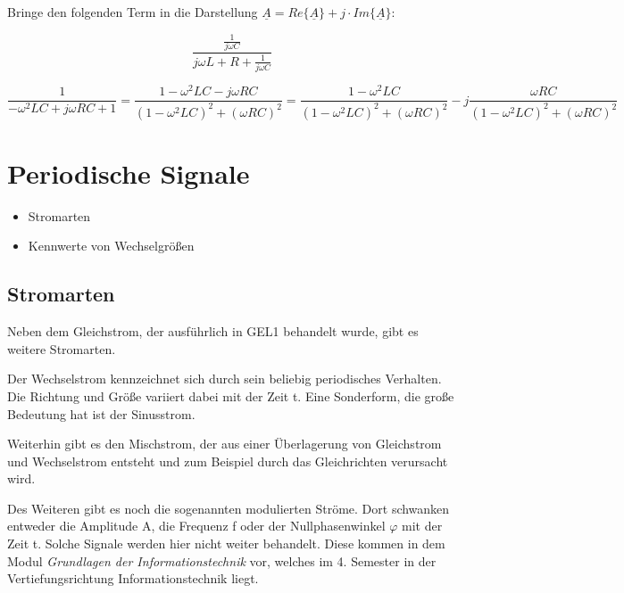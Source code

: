 \documentclass[
  ngerman,
  letterpaper,
]{scrbook}
\providecommand{\tightlist}{%
  \setlength{\itemsep}{0pt}\setlength{\parskip}{0pt}}
\begin{document}
Bringe den folgenden Term in die Darstellung
\(\underline{A} = Re\{\underline{A}\} + j \cdot Im\{\underline{A}\}\):

\[\frac{\frac{1}{j\omega C}}{j\omega L + R + \frac{1}{j\omega C}}\]

\begin{tcolorbox}[enhanced jigsaw, titlerule=0mm, rightrule=.15mm, toprule=.15mm, colback=white, toptitle=1mm, bottomrule=.15mm, coltitle=black, leftrule=.75mm, arc=.35mm, colbacktitle=quarto-callout-caution-color!10!white, opacityback=0, bottomtitle=1mm, colframe=quarto-callout-caution-color-frame, opacitybacktitle=0.6, breakable, title=\textcolor{quarto-callout-caution-color}{\faFire}\hspace{0.5em}{Lösung 2.11}, left=2mm]

\[
\frac{1}{- \omega^2 LC + j\omega RC + 1} = \frac{1 - \omega^2 LC - j\omega RC}{(1 - \omega^2 LC)^2 + (\omega RC)^2} =
\frac{1 - \omega^2 LC}{(1 - \omega^2 LC)^2 + (\omega RC)^2} - j\frac{\omega RC}{(1 - \omega^2 LC)^2 + (\omega RC)^2}
\]

\end{tcolorbox}

\chapter{Periodische Signale}\label{periodische-signale-1}

\begin{itemize}
\tightlist
\item
  Stromarten
\item
  Kennwerte von Wechselgrößen
\end{itemize}

\section{Stromarten}\label{stromarten}

Neben dem Gleichstrom, der ausführlich in GEL1 behandelt wurde, gibt es
weitere Stromarten.

Der Wechselstrom kennzeichnet sich durch sein beliebig periodisches
Verhalten. Die Richtung und Größe variiert dabei mit der Zeit t. Eine
Sonderform, die große Bedeutung hat ist der Sinusstrom.

Weiterhin gibt es den Mischstrom, der aus einer Überlagerung von
Gleichstrom und Wechselstrom entsteht und zum Beispiel durch das
Gleichrichten verursacht wird.

Des Weiteren gibt es noch die sogenannten modulierten Ströme. Dort
schwanken entweder die Amplitude A, die Frequenz f oder der
Nullphasenwinkel \(\varphi\) mit der Zeit t. Solche Signale werden hier
nicht weiter behandelt. Diese kommen in dem Modul \emph{Grundlagen der
Informationstechnik} vor, welches im 4. Semester in der
Vertiefungsrichtung Informationstechnik liegt.
\end{document}

